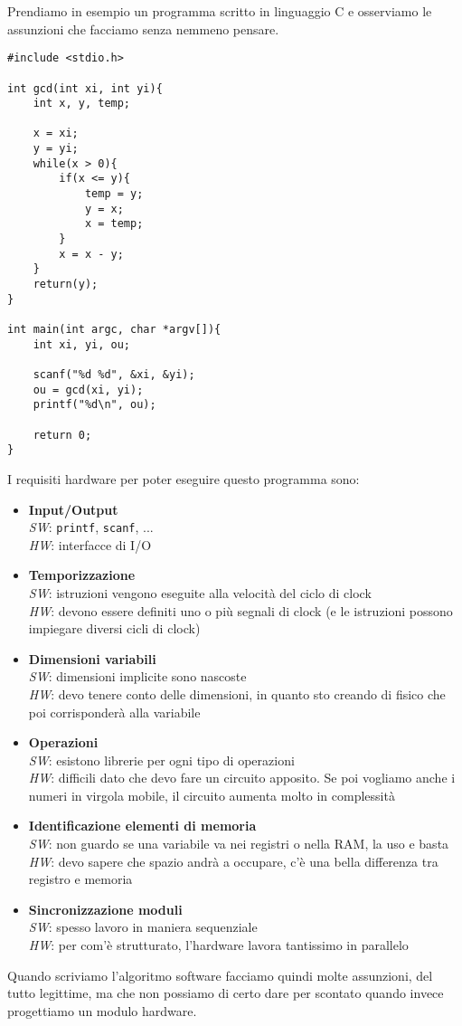 \documentclass[10pt,a4paper,oneside]{scrbook}
\begin{document}
Prendiamo in esempio un programma scritto in linguaggio C e osserviamo le assunzioni che facciamo senza nemmeno pensare.\\
\begin{verbatim}
#include <stdio.h>

int gcd(int xi, int yi){
   	int x, y, temp;
   	
   	x = xi;
   	y = yi;
   	while(x > 0){
   		if(x <= y){
   			temp = y;
   			y = x;
   			x = temp;
   		}
   		x = x - y;
   	}
   	return(y);
}

int main(int argc, char *argv[]){
   	int xi, yi, ou;
    
    scanf("%d %d", &xi, &yi);
    ou = gcd(xi, yi);
    printf("%d\n", ou);
    
    return 0;
}
\end{verbatim}
I requisiti hardware per poter eseguire questo programma sono:
\begin{itemize}
    \item \textbf{Input/Output}\\
    \textit{SW}: \texttt{printf}, \texttt{scanf}, ...\\
    \textit{HW}: interfacce di I/O
    \item \textbf{Temporizzazione}\\
    \textit{SW}: istruzioni vengono eseguite alla velocità del ciclo di clock\\
    \textit{HW}: devono essere definiti uno o più segnali di clock (e le istruzioni possono impiegare diversi cicli di clock)
    \item \textbf{Dimensioni variabili}\\
    \textit{SW}: dimensioni implicite sono nascoste\\
    \textit{HW}: devo tenere conto delle dimensioni, in quanto sto creando di fisico che poi corrisponderà alla variabile
    \item \textbf{Operazioni}\\
    \textit{SW}: esistono librerie per ogni tipo di operazioni\\
    \textit{HW}: difficili dato che devo fare un circuito apposito. Se poi vogliamo anche i numeri in virgola mobile, il circuito aumenta molto in complessità
    \item \textbf{Identificazione elementi di memoria}\\
    \textit{SW}: non guardo se una variabile va nei registri o nella RAM, la uso e basta\\
    \textit{HW}: devo sapere che spazio andrà a occupare, c'è una bella differenza tra registro e memoria
    \item \textbf{Sincronizzazione moduli}\\
    \textit{SW}: spesso lavoro in maniera sequenziale\\
    \textit{HW}: per com'è strutturato, l'hardware lavora tantissimo in parallelo        
\end{itemize}
Quando scriviamo l'algoritmo software facciamo quindi molte assunzioni, del tutto legittime, ma che non possiamo di certo dare per 
scontato quando invece progettiamo un modulo hardware.
\end{document}
